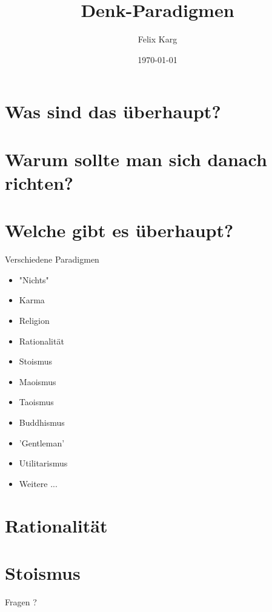 \documentclass[13pt,compress,ngerman,utf8,t]{beamer}
\date{\today}
\institute{University of Freiburg}
\title{Denk-Paradigmen}
\author{Felix Karg}
\begin{document}
\maketitle



\section{Was sind das überhaupt?}


\section{Warum sollte man sich danach richten?}


\section{Welche gibt es überhaupt?}
\begin{frame}{Verschiedene Paradigmen}
    \begin{itemize}
        \item "Nichts"
        \item Karma
        \item Religion
        \item Rationalität
        \item Stoismus
        \item Maoismus
        \item Taoismus
        \item Buddhismus
        \item 'Gentleman'
        \item Utilitarismus
        \item Weitere ...
    \end{itemize}
\end{frame}


\section{Rationalität}


\section{Stoismus}


\begin{frame}[standout]
    Fragen ?
\end{frame}
\end{document}
